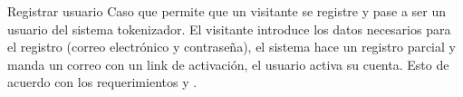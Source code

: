 %
%

{Registrar usuario}
{
  Caso que permite que un visitante se registre y pase a ser
  un usuario del sistema tokenizador. El visitante introduce los datos
  necesarios para el registro (correo electrónico y contraseña), el sistema
  hace un registro parcial y manda un correo con un link de activación, el
  usuario activa su cuenta. Esto de acuerdo con los requerimientos
   y
  .
}
